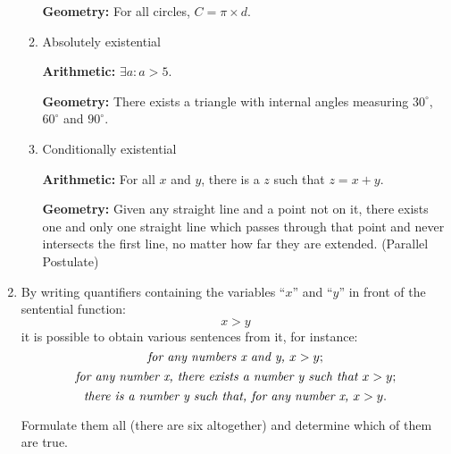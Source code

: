 \begin{enumerate}
\begin{enumerate}
    \textbf{Geometry:} For all circles, $C=\pi \times d$.

  \item Absolutely existential

    \textbf{Arithmetic:} $\exists a : a > 5$.

    \textbf{Geometry:} There exists a triangle with internal angles
    measuring $30^{\circ}$, $60^{\circ}$ and $90^{\circ}$.

  \item Conditionally existential

    \textbf{Arithmetic:} For all $x$ and $y$, there is a $z$ such that
    $z = x + y$. %

    \textbf{Geometry:} Given any straight line and a point not on it,
    there exists one and only one straight line which passes through
    that point and never intersects the first line, no matter how far
    they are extended. (Parallel Postulate)

  \end{enumerate}

\item By writing quantifiers containing the variables ``$x$'' and
  ``$y$'' in front of the sentential function: $$ x > y $$ it is
  possible to obtain various sentences from it, for instance:
\begin{equation*}
\emph{for any numbers x and y, } x > y;
\end{equation*}
\begin{equation*}
\emph{for any number x, there exists a number y such that } x > y;
\end{equation*}
\begin{equation*}
\emph{there is a number y such that, for any number x, } x > y.
\end{equation*}

Formulate them all (there are six altogether) and determine which of
them are true.


\end{enumerate}

